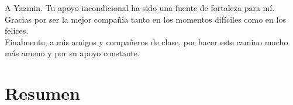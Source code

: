 \documentclass[letterpaper,12pt,twoside]{book}  %
\begin{document}
\noindent A Yazmin. Tu apoyo incondicional ha sido una fuente de fortaleza para mí. Gracias por ser la mejor compañia tanto en los momentos difíciles como en los felices. \\[0.2cm]

\noindent Finalmente, a mis amigos y compañeros de clase, por hacer este camino mucho más ameno y por su apoyo constante. \\[0.2cm]

\chapter*{Resumen}


\tableofcontents

\listoffigures
\listoftables

\mainmatter

\setlength{\parskip}{6pt}
















\appendix


\backmatter
\end{document}
